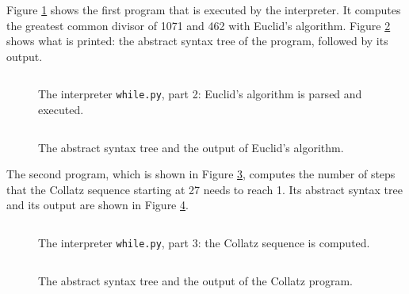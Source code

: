\documentclass[11pt,a4paper]{article}
\newcommand{\codefigure}[5][]{\begin{figure}[H]%
  \inputminted[numbers = left, numbersep = 0.3cm, #1]{#2}{examples/#3}%
  \vspace*{-0.3cm}%
  \caption{#5}\label{#4}\end{figure}}
\newcommand{\outputfigure}[2]{\codefigure[numbers = none, breaklines]{text}{output/#1.txt}{fig:#1.txt}{#2}}
\begin{document}
Figure \ref{fig:while.py:euclid} shows the first program that is executed by the interpreter.  It computes
the greatest common divisor of 1071 and 462 with Euclid's algorithm.  Figure \ref{fig:while-euclid.txt}
shows what is printed: the abstract syntax tree of the program, followed by its output.
\codefigure[firstline = 42, lastline = 55, firstnumber = 42]{python3}{while.py}{fig:while.py:euclid}{The
  interpreter \texttt{while.py}, part 2: Euclid's algorithm is parsed and executed.}
\outputfigure{while-euclid}{The abstract syntax tree and the output of Euclid's algorithm.}
The second program, which is shown in Figure \ref{fig:while.py:collatz}, computes the number of steps that
the Collatz sequence starting at 27 needs to reach 1.  Its abstract syntax tree and its output are shown in
Figure \ref{fig:while-collatz.txt}.
\codefigure[firstline = 57, firstnumber = 57]{python3}{while.py}{fig:while.py:collatz}{The interpreter
  \texttt{while.py}, part 3: the Collatz sequence is computed.}
\outputfigure{while-collatz}{The abstract syntax tree and the output of the Collatz program.}
\end{document}
